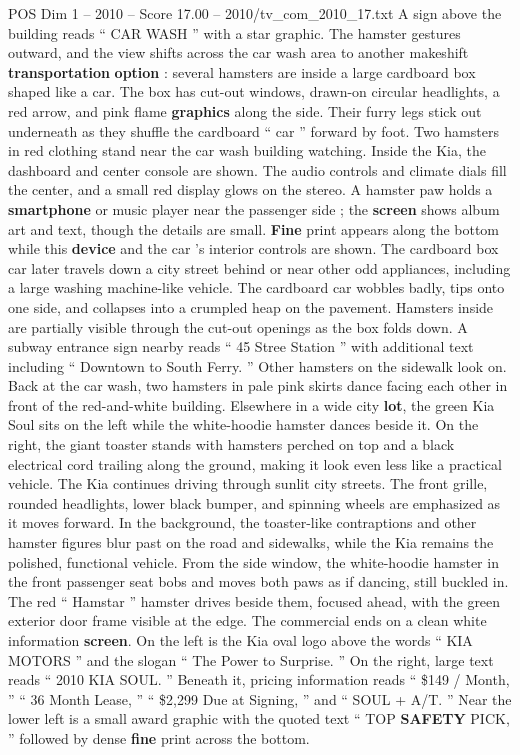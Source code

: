 \begin{textsample}{POS Dim 1 – 2010 – Score 17.00 – 2010/tv\_com\_2010\_17.txt}
A sign above the building reads “ CAR WASH ” with a star graphic.
The hamster gestures outward, and the view shifts across the car wash area to another makeshift \textbf{transportation} \textbf{option} : several hamsters are inside a large cardboard box shaped like a car.
The box has cut-out windows, drawn-on circular headlights, a red arrow, and pink flame \textbf{graphics} along the side.
Their furry legs stick out underneath as they shuffle the cardboard “ car ” forward by foot.
Two hamsters in red clothing stand near the car wash building watching.
Inside the Kia, the dashboard and center console are shown.
The audio controls and climate dials fill the center, and a small red display glows on the stereo.
A hamster paw holds a \textbf{smartphone} or music player near the passenger side ; the \textbf{screen} shows album art and text, though the details are small. \textbf{Fine} print appears along the bottom while this \textbf{device} and the car ’s interior controls are shown.
The cardboard box car later travels down a city street behind or near other odd appliances, including a large washing machine-like vehicle.
The cardboard car wobbles badly, tips onto one side, and collapses into a crumpled heap on the pavement.
Hamsters inside are partially visible through the cut-out openings as the box folds down.
A subway entrance sign nearby reads “ 45 Stree Station ” with additional text including “ Downtown to South Ferry. ” Other hamsters on the sidewalk look on.
Back at the car wash, two hamsters in pale pink skirts dance facing each other in front of the red-and-white building.
Elsewhere in a wide city \textbf{lot}, the green Kia Soul sits on the left while the white-hoodie hamster dances beside it.
On the right, the giant toaster stands with hamsters perched on top and a black electrical cord trailing along the ground, making it look even less like a practical vehicle.
The Kia continues driving through sunlit city streets.
The front grille, rounded headlights, lower black bumper, and spinning wheels are emphasized as it moves forward.
In the background, the toaster-like contraptions and other hamster figures blur past on the road and sidewalks, while the Kia remains the polished, functional vehicle.
From the side window, the white-hoodie hamster in the front passenger seat bobs and moves both paws as if dancing, still buckled in.
The red “ Hamstar ” hamster drives beside them, focused ahead, with the green exterior door frame visible at the edge.
The commercial ends on a clean white information \textbf{screen}.
On the left is the Kia oval logo above the words “ KIA MOTORS ” and the slogan “ The Power to Surprise. ” On the right, large text reads “ 2010 KIA SOUL. ” Beneath it, pricing information reads “ \$149 / Month, ” “ 36 Month Lease, ” “ \$2,299 Due at Signing, ” and “ SOUL + A/T. ” Near the lower left is a small award graphic with the quoted text “ TOP \textbf{SAFETY} PICK, ” followed by dense \textbf{fine} print across the bottom.

\end{textsample}
